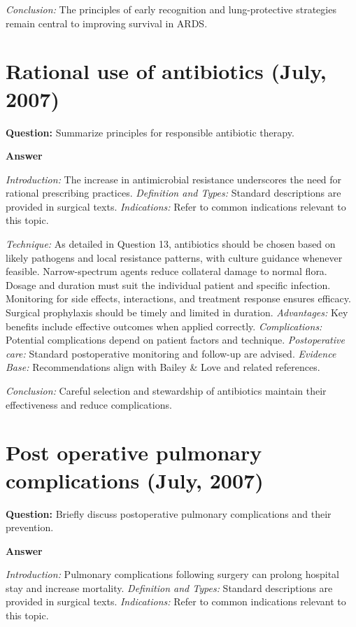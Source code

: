 \documentclass{article}
\begin{document}
\emph{Conclusion:} The principles of early recognition and lung-protective strategies remain central to improving survival in ARDS.


\section{Rational use of antibiotics (July, 2007)}

\textbf{Question:} Summarize principles for responsible antibiotic therapy.

\textbf{Answer}

\emph{Introduction:} The increase in antimicrobial resistance underscores the need for rational prescribing practices.
\emph{Definition and Types:} Standard descriptions are provided in surgical texts.
\emph{Indications:} Refer to common indications relevant to this topic.

\emph{Technique:} As detailed in Question 13, antibiotics should be chosen based on likely pathogens and local resistance patterns, with culture guidance whenever feasible. Narrow-spectrum agents reduce collateral damage to normal flora. Dosage and duration must suit the individual patient and specific infection. Monitoring for side effects, interactions, and treatment response ensures efficacy. Surgical prophylaxis should be timely and limited in duration.
\emph{Advantages:} Key benefits include effective outcomes when applied correctly.
\emph{Complications:} Potential complications depend on patient factors and technique.
\emph{Postoperative care:} Standard postoperative monitoring and follow-up are advised.
\emph{Evidence Base:} Recommendations align with Bailey \& Love and related references.

\emph{Conclusion:} Careful selection and stewardship of antibiotics maintain their effectiveness and reduce complications.


\section{Post operative pulmonary complications (July, 2007)}

\textbf{Question:} Briefly discuss postoperative pulmonary complications and their prevention.

\textbf{Answer}

\emph{Introduction:} Pulmonary complications following surgery can prolong hospital stay and increase mortality.
\emph{Definition and Types:} Standard descriptions are provided in surgical texts.
\emph{Indications:} Refer to common indications relevant to this topic.
\end{document}
